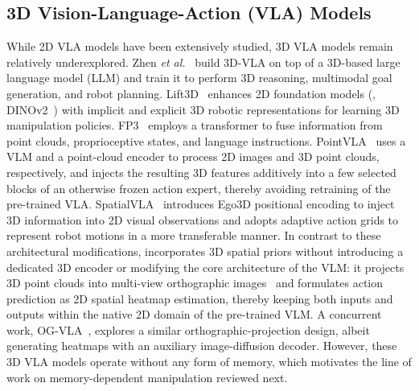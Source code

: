 \subsection{3D Vision-Language-Action (VLA) Models}

While 2D VLA models have been extensively studied, 3D VLA models
\cite{zhen20243d,yang2025fp3,li2025pointvla,
qu2025spatialvla} remain relatively underexplored.
Zhen \textit{et al.}~\cite{zhen20243d} build 3D-VLA on top of a 3D-based large
language model (LLM) and train it to perform 3D reasoning, multimodal goal
generation, and robot planning.
Lift3D~\cite{jia2024lift3d} enhances 2D foundation models
(\eg, DINOv2~\cite{oquab2023dinov2}) with implicit and explicit 3D robotic
representations for learning 3D manipulation policies.
FP3~\cite{yang2025fp3} employs a transformer to fuse information from point
clouds, proprioceptive states, and language instructions.
PointVLA~\cite{li2025pointvla} uses a VLM and a point-cloud encoder to process
2D images and 3D point clouds, respectively, and injects the resulting 3D
features additively into a few selected blocks of an otherwise frozen action
expert, thereby avoiding retraining of the pre-trained VLA.
SpatialVLA~\cite{qu2025spatialvla} introduces Ego3D positional encoding to
inject 3D information into 2D visual observations and adopts adaptive action
grids to represent robot motions in a more transferable manner.
In contrast to these architectural modifications, \method incorporates 3D
spatial priors without introducing a dedicated 3D encoder or modifying the
core architecture of the VLM: it projects 3D point clouds into multi-view
orthographic images~\cite{goyal2023rvt,goyal2024rvt} and formulates action
prediction as 2D spatial heatmap estimation, thereby keeping both inputs
and outputs within the native 2D domain of the pre-trained VLM.
A concurrent work, OG-VLA~\cite{singh2025ogvla}, explores a similar
orthographic-projection design, albeit generating heatmaps with an
auxiliary image-diffusion decoder.
However, these 3D VLA models operate without any form of memory, which
motivates the line of work on memory-dependent manipulation reviewed next.



